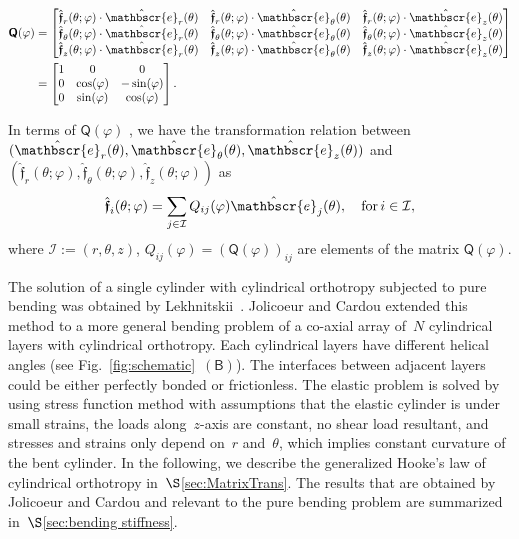 \documentclass[preprint,10pt,times]{elsarticle}
\numberwithin{equation}{section}
\newcommand{\physe}{\hat{\mathbscr{e}}} %
\newcommand{\physf}{\hat{\boldsymbol{\mathfrak{f}}}}
\renewcommand{\u}[1]{\boldsymbol{#1}}
\newcommand{\usf}[1]{\u{\mathsf #1}}
\newcommand{\pr}[1]{\left( #1 \right)}
\newcommand{\subf}[1]{\pr{\textsf{#1}}}
\renewcommand{\>}{$\Rightarrow$}
\begin{document}
\begin{align}
\usf{Q}(\varphi)
& = \begin{bmatrix}
\physf_{r}(\theta;\varphi)\cdot \physe_{r}(\theta) & \physf_{r}(\theta;\varphi)\cdot \physe_{\theta}(\theta) & \physf_{r}(\theta;\varphi)\cdot \physe_{z}(\theta) \\\physf_{\theta}(\theta;\varphi)\cdot \physe_{r}(\theta) & \physf_{\theta}(\theta;\varphi)\cdot \physe_{\theta}(\theta) & \physf_{\theta}(\theta;\varphi)\cdot \physe_{z}(\theta) \\\physf_{z}(\theta;\varphi)\cdot \physe_{r}(\theta) & \physf_{z}(\theta;\varphi)\cdot \physe_{\theta}(\theta) & \physf_{z}(\theta;\varphi)\cdot \physe_{z}(\theta)
\end{bmatrix}\\
& = \begin{bmatrix}
1 & 0 & 0 \\
 0 & \cos(\varphi) & -\sin(\varphi) \\
 0 & \sin(\varphi) & \cos(\varphi)
 \end{bmatrix}.
\end{align}

In terms of $\usf{Q}(\varphi)$ , we have the transformation relation between~$(\physe_{r}(\theta),\physe_{\theta}(\theta),\physe_{z}(\theta))$ and~$(\physf_{r}(\theta;\varphi),\physf_{\theta}(\theta;\varphi),\physf_{z}(\theta;\varphi))$ as
\begin{equation}
\physf_{i} (\theta;\varphi) = \sum_{j \in \mathcal{I} } Q_{ij}(\varphi)\physe_{j}(\theta), \quad \text{for} \,i \in \mathcal{I} ,
\label{eq:Qtransform}
\end{equation}
where $\mathcal{I} :=\pr{r,\theta,z}$,  $Q_{ij}(\varphi) = \pr{\usf{Q}(\varphi)}_{ij}$ are elements of the matrix $\usf{Q}(\varphi)$.


The solution of a single cylinder with cylindrical orthotropy subjected to pure bending was obtained by Lekhnitskii~\cite{Lekhnitskii1981}. Jolicoeur and Cardou extended this method to a more general bending problem of a co-axial array of~$N$ cylindrical layers with cylindrical orthotropy. Each cylindrical layers have different helical angles (see Fig.~\ref{fig:schematic}~$\subf{B}$). The interfaces between adjacent layers could be either perfectly bonded or frictionless. The elastic problem is solved by using stress function method with assumptions that the elastic cylinder is under small strains, the loads along~$z$-axis are constant, no shear load resultant, and stresses and strains only depend on~$r$ and~$\theta$, which implies constant curvature of the bent cylinder. In the following, we describe the generalized Hooke's law of cylindrical orthotropy in~$\S$\ref{sec:MatrixTrans}. The results that are obtained by Jolicoeur and Cardou and relevant to the pure bending problem are summarized in~$\S$\ref{sec:bending stiffness}.
\end{document}

